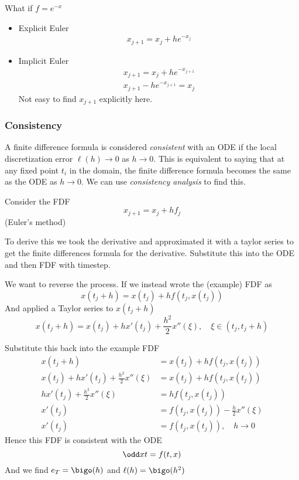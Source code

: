 \documentclass{X:/Documents/Coding/Latex/myassignment}
\begin{document}
What if $f = e^{-x}$

\begin{itemize}
    \item Explicit Euler
    \begin{align*}
        x_{j+1} = x_j + h e^{-x_j}
    \end{align*}
    \item Implicit Euler
    \begin{align*}
        x_{j+1} = x_j + h e^{-x_{j+1}}\\
        x_{j+1} - h e^{-x_{j+1}} = x_j
    \end{align*}
    Not easy to find $x_{j+1}$ explicitly here.
\end{itemize}

\subsubsection{Consistency}
A finite difference formula is considered \textit{consistent} with an ODE if the local discretization error $\ell(h) \to 0$ as $h\to 0$. This is equivalent to saying that at any fixed point $t_i$ in the domain, the finite difference formula becomes the same as the ODE as $h\to 0$. We can use \textit{consistency analysis} to find this.

Consider the FDF
\[x_{j+1} = x_j + hf_j\]
(Euler's method)

To derive this we took the derivative and approximated it with a taylor series to get the finite differences formula for the derivative. Substitute this into the ODE and then FDF with timestep. 

We want to reverse the process. If we instead wrote the (example) FDF as
\[x(t_j+h) = x(t_j) + hf(t_j,x(t_{j}))\]
And applied a Taylor series to $x(t_j+h)$
\[x(t_j+h) = x(t_j) + hx'(t_j) + \frac{h^2}{2} x''(\xi), \quad \xi \in (t_j,t_j+h)\]

Substitute this back into the example FDF
\begin{align*}
    x(t_j+h) &= x(t_j) + hf(t_j,x(t_{j}))\\
    x(t_j) + hx'(t_j) + \frac{h^2}{2} x''(\xi)&= x(t_j) + hf(t_j,x(t_{j}))\\
    hx'(t_j) + \frac{h^2}{2} x''(\xi)&= hf(t_j,x(t_{j}))\\
    x'(t_j) &= f(t_j,x(t_{j}))-\frac{h}{2} x''(\xi)\\
    x'(t_j) &= f(t_j,x(t_{j})), \quad h\to 0
\end{align*}
Hence this FDF is consistent with the ODE
\[\odd xt = f(t,x)\]
And we find $e_T = \bigo(h)$ and $\ell(h) = \bigo(h^2)$
\end{document}

